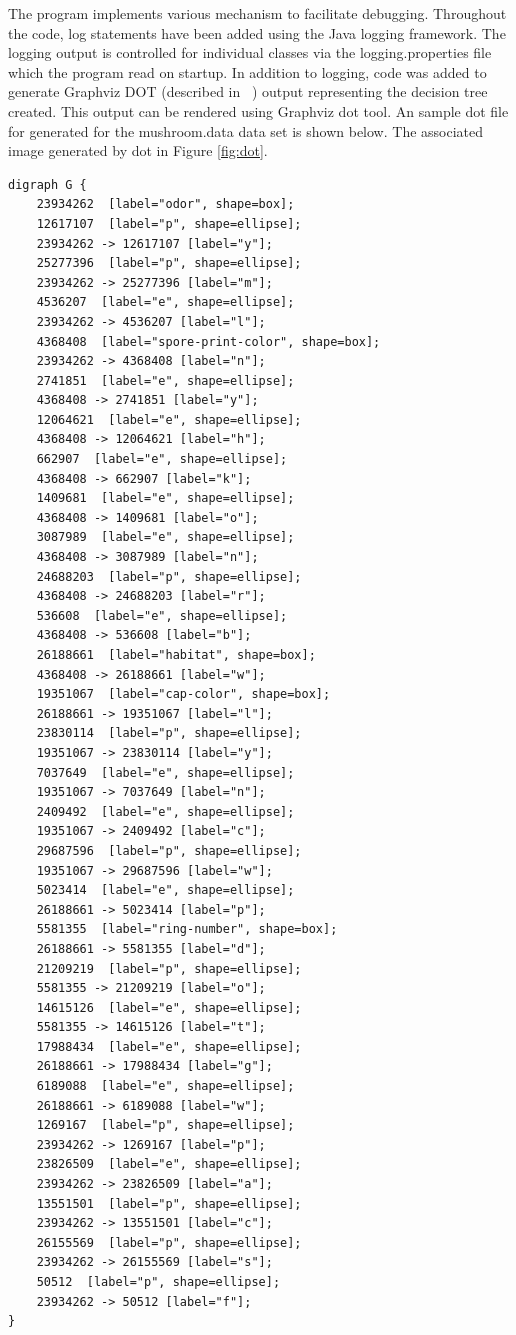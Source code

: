 \documentclass[10pt]{report}
\begin{document}
The program implements various mechanism to facilitate
debugging. Throughout the code, log statements have been added using
the Java logging framework. The logging output is controlled for
individual classes via the logging.properties file which the program
read on startup. In addition to logging, code was added to generate
Graphviz DOT (described in ~\cite{Graphviz2001}) output representing
the decision tree created. This output can be rendered using Graphviz
dot tool. An sample dot file for generated for the mushroom.data data
set is shown below. The associated image generated by dot in Figure
\ref{fig:dot}.


\begin{verbatim}
digraph G {
	23934262  [label="odor", shape=box];
	12617107  [label="p", shape=ellipse];
	23934262 -> 12617107 [label="y"];
	25277396  [label="p", shape=ellipse];
	23934262 -> 25277396 [label="m"];
	4536207  [label="e", shape=ellipse];
	23934262 -> 4536207 [label="l"];
	4368408  [label="spore-print-color", shape=box];
	23934262 -> 4368408 [label="n"];
	2741851  [label="e", shape=ellipse];
	4368408 -> 2741851 [label="y"];
	12064621  [label="e", shape=ellipse];
	4368408 -> 12064621 [label="h"];
	662907  [label="e", shape=ellipse];
	4368408 -> 662907 [label="k"];
	1409681  [label="e", shape=ellipse];
	4368408 -> 1409681 [label="o"];
	3087989  [label="e", shape=ellipse];
	4368408 -> 3087989 [label="n"];
	24688203  [label="p", shape=ellipse];
	4368408 -> 24688203 [label="r"];
	536608  [label="e", shape=ellipse];
	4368408 -> 536608 [label="b"];
	26188661  [label="habitat", shape=box];
	4368408 -> 26188661 [label="w"];
	19351067  [label="cap-color", shape=box];
	26188661 -> 19351067 [label="l"];
	23830114  [label="p", shape=ellipse];
	19351067 -> 23830114 [label="y"];
	7037649  [label="e", shape=ellipse];
	19351067 -> 7037649 [label="n"];
	2409492  [label="e", shape=ellipse];
	19351067 -> 2409492 [label="c"];
	29687596  [label="p", shape=ellipse];
	19351067 -> 29687596 [label="w"];
	5023414  [label="e", shape=ellipse];
	26188661 -> 5023414 [label="p"];
	5581355  [label="ring-number", shape=box];
	26188661 -> 5581355 [label="d"];
	21209219  [label="p", shape=ellipse];
	5581355 -> 21209219 [label="o"];
	14615126  [label="e", shape=ellipse];
	5581355 -> 14615126 [label="t"];
	17988434  [label="e", shape=ellipse];
	26188661 -> 17988434 [label="g"];
	6189088  [label="e", shape=ellipse];
	26188661 -> 6189088 [label="w"];
	1269167  [label="p", shape=ellipse];
	23934262 -> 1269167 [label="p"];
	23826509  [label="e", shape=ellipse];
	23934262 -> 23826509 [label="a"];
	13551501  [label="p", shape=ellipse];
	23934262 -> 13551501 [label="c"];
	26155569  [label="p", shape=ellipse];
	23934262 -> 26155569 [label="s"];
	50512  [label="p", shape=ellipse];
	23934262 -> 50512 [label="f"];
}
\end{verbatim}
\end{document}
